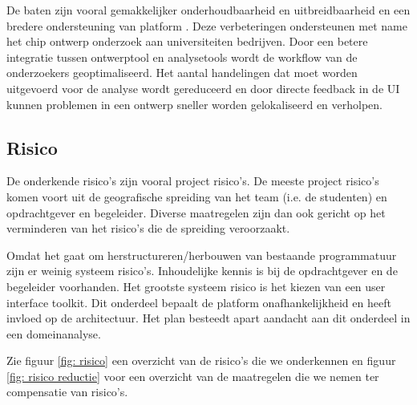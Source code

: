 De baten zijn vooral gemakkelijker onderhoudbaarheid en uitbreidbaarheid en een bredere ondersteuning van platform .
Deze verbeteringen ondersteunen met name het chip ontwerp onderzoek aan universiteiten bedrijven. Door een betere integratie
tussen ontwerptool en analysetools wordt de workflow van de onderzoekers geoptimaliseerd. Het aantal handelingen
dat moet worden uitgevoerd voor de analyse wordt gereduceerd en door directe feedback in de UI kunnen problemen in een ontwerp
sneller worden gelokaliseerd en verholpen.


\subsection{Risico}

De onderkende risico's zijn vooral project risico's. De meeste project risico's komen voort uit de
geografische spreiding van het team (i.e. de studenten) en opdrachtgever
en begeleider. Diverse maatregelen zijn dan ook gericht op het verminderen
van het risico's die de spreiding veroorzaakt.


Omdat het gaat om herstructureren/herbouwen van bestaande programmatuur zijn er weinig systeem risico's.
Inhoudelijke kennis is bij de opdrachtgever en de begeleider voorhanden. Het grootste systeem risico is het kiezen
van een user interface toolkit. Dit onderdeel bepaalt de platform onafhankelijkheid en heeft invloed op de architectuur.
Het plan besteedt apart aandacht aan dit onderdeel in een domeinanalyse.

Zie figuur \ref{fig: risico} een overzicht van de risico's die we onderkennen en figuur \ref{fig: risico reductie} voor
een overzicht van de maatregelen die we nemen ter compensatie van risico's.


